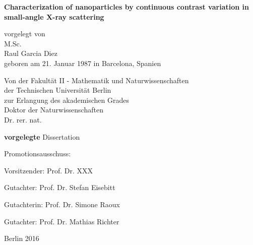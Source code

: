 
\begin{titlepage}
{\noindent\sffamily\large%
    \begin{center}
        \vspace*{3ex}
        {\LARGE\bfseries\sffamily
            Characterization of nanoparticles by continuous contrast variation in small-angle X-ray scattering
        }
        \vspace{1cm}

        vorgelegt von \\
        M.Sc. \\
        Raul Garcia Diez \\
        geboren am 21. Januar 1987 in Barcelona, Spanien \\
        \vspace{4cm}

        Von der Fakultät II - Mathematik und Naturwissenschaften \\
        der Technischen Universität Berlin \\
        zur Erlangung des akademischen Grades \\
        Doktor der Naturwissenschaften \\
        Dr. rer. nat. \\
        \vspace{3ex}

        \textbf{vorgelegte} Dissertation \\
        \vspace{2cm}
    \end{center}

    Promotionsausschuss:
    \vspace{2ex}

    Vorsitzender: Prof. Dr. XXX

    Gutachter: Prof. Dr. Stefan Eisebitt

    Gutachterin: Prof. Dr. Simone Raoux

    Gutachter: Prof. Dr. Mathias Richter
    \vspace{1ex}


    \vfill
    \begin{center}
        Berlin 2016
    \end{center}
}
\end{titlepage}

\cleardoublepage

